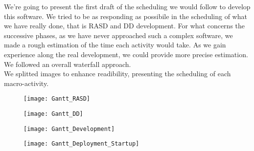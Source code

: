 We're going to present the first draft of the scheduling we would follow to develop this software. We tried to be as responding as possibile in the scheduling of what we have really done, that is RASD and DD development. For what concerns the successive phases, as we have never approached such a complex software, we made a rough estimation of the time each activity would take. As we gain experience along the real development, we could provide more precise estimation. We followed an overall waterfall approach.\\
We splitted images to enhance readibility, presenting the scheduling of each macro-activity.\\

\begin{figure}
\vspace*{-4cm}\texttt{[image: Gantt\_RASD]}
\end{figure}
\begin{figure}
\vspace*{-4cm}\texttt{[image: Gantt\_DD]}
\end{figure}
\begin{figure}
\vspace*{-4cm}\texttt{[image: Gantt\_Development]}
\end{figure}
\begin{figure}
\hspace*{+4cm}\vspace{-3.5cm}\texttt{[image: Gantt\_Deployment\_Startup]}
\end{figure}